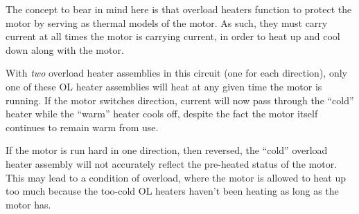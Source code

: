 





The concept to bear in mind here is that overload heaters function to protect the motor by serving as thermal models of the motor.  As such, they must carry current at all times the motor is carrying current, in order to heat up and cool down along with the motor.  

With {\it two} overload heater assemblies in this circuit (one for each direction), only one of these OL heater assemblies will heat at any given time the motor is running.  If the motor switches direction, current will now pass through the ``cold'' heater while the ``warm'' heater cools off, despite the fact the motor itself continues to remain warm from use.

\vskip 10pt

If the motor is run hard in one direction, then reversed, the ``cold'' overload heater assembly will not accurately reflect the pre-heated status of the motor.  This may lead to a condition of overload, where the motor is allowed to heat up too much because the too-cold OL heaters haven't been heating as long as the motor has.










